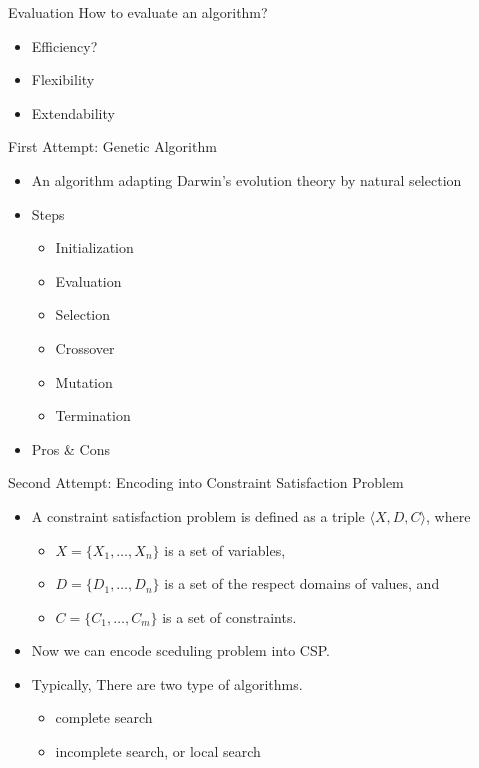 \begin{frame}[t]{Evaluation}
  How to evaluate an algorithm?
  \begin{itemize}[<+->]
    \item Efficiency?
    \item Flexibility
    \item Extendability
  \end{itemize}
\end{frame}

\begin{frame}[t]{First Attempt: Genetic Algorithm}
  \begin{itemize}
    \item An algorithm adapting Darwin's evolution theory by natural selection
    \item Steps
      \begin{itemize}
        \item Initialization
        \item Evaluation
        \item Selection
        \item Crossover
        \item Mutation
        \item Termination
      \end{itemize}
    \item Pros \& Cons
  \end{itemize}
\end{frame}

\begin{frame}[t]{Second Attempt: Encoding into Constraint Satisfaction Problem}
  \begin{itemize}[<+->]
    \item A constraint satisfaction problem is defined as a triple $\langle X,D,C
      \rangle$, where
      \begin{itemize}
          \item $X = \{X_1, \ldots,X_n\}$ is a set of variables,
          \item $D = \{D_1, \ldots, D_n\}$ is a set of the respect domains of values,
          and
          \item $C = \{C_1, \ldots, C_m\}$ is a set of constraints.
      \end{itemize}
    \item Now we can encode sceduling problem into CSP.
    \item Typically, There are two type of algorithms.
      \begin{itemize}
        \item complete search
        \item incomplete search, or local search
      \end{itemize}
  \end{itemize}
\end{frame}

